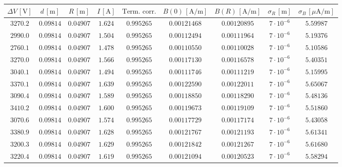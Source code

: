 \documentclass[]{article}
\begin{document}
\begin{table}
    \centering

\begin{tabular}{||c|c|c|c|c|c|c|c|c||}
    \hline
    $\Delta V\, [\text{V}] $ & $d\, [\text{m}] $ & $R\, [\text{m}] $ & $I\, [\text{A}] $ & $\text{Term. corr.}$ & $B(0)\, [\text{A/m}] $ & $B(R)\, [\text{A/m}] $ & $ \sigma_R \, [\text{m}] $ & $ \sigma_B \, [\mu\text{A/m}] $ \\
    \hline\hline



    $3270.2$ & $0.09814$ & $0.04907$ & $1.624$ & $0.995265$ & $0.00121468$ & $0.00120895$ & $7 \cdot 10^{-6}$ & $5.59987$ \\\hline
    $2990.0$ & $0.09814$ & $0.04907$ & $1.504$ & $0.995265$ & $0.00112494$ & $0.00111964$ & $7 \cdot 10^{-6}$ & $5.19376$ \\\hline
    $2760.1$ & $0.09814$ & $0.04907$ & $1.478$ & $0.995265$ & $0.00110550$ & $0.00110028$ & $7 \cdot 10^{-6}$ & $5.10586$ \\\hline
    $3270.0$ & $0.09814$ & $0.04907$ & $1.566$ & $0.995265$ & $0.00117130$ & $0.00116578$ & $7 \cdot 10^{-6}$ & $5.40351$ \\\hline
    $3040.1$ & $0.09814$ & $0.04907$ & $1.494$ & $0.995265$ & $0.00111746$ & $0.00111219$ & $7 \cdot 10^{-6}$ & $5.15995$ \\\hline
    $3370.1$ & $0.09814$ & $0.04907$ & $1.639$ & $0.995265$ & $0.00122590$ & $0.00122011$ & $7 \cdot 10^{-6}$ & $5.65067$ \\\hline
    $3090.4$ & $0.09814$ & $0.04907$ & $1.589$ & $0.995265$ & $0.00118850$ & $0.00118290$ & $7 \cdot 10^{-6}$ & $5.48136$ \\\hline
    $3410.2$ & $0.09814$ & $0.04907$ & $1.600$ & $0.995265$ & $0.00119673$ & $0.00119109$ & $7 \cdot 10^{-6}$ & $5.51860$ \\\hline
    $3070.6$ & $0.09814$ & $0.04907$ & $1.574$ & $0.995265$ & $0.00117729$ & $0.00117174$ & $7 \cdot 10^{-6}$ & $5.43058$ \\\hline
    $3380.9$ & $0.09814$ & $0.04907$ & $1.628$ & $0.995265$ & $0.00121767$ & $0.00121193$ & $7 \cdot 10^{-6}$ & $5.61341$ \\\hline
    $3200.3$ & $0.09814$ & $0.04907$ & $1.629$ & $0.995265$ & $0.00121842$ & $0.00121267$ & $7 \cdot 10^{-6}$ & $5.61680$ \\\hline
    $3220.4$ & $0.09814$ & $0.04907$ & $1.619$ & $0.995265$ & $0.00121094$ & $0.00120523$ & $7 \cdot 10^{-6}$ & $5.58294$ \\\hline

\end{tabular}
\end{table}
\end{document}
